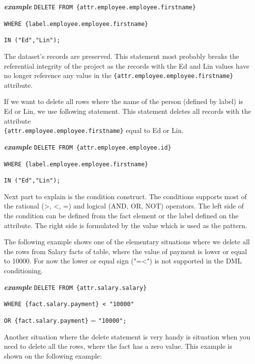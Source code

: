 \documentclass[a4paper, 12pt, titlepage, fleqn]{article}
\begin{document}
\textbf{\emph{example}}  \hspace{.9cm}\verb=DELETE FROM {attr.employee.employee.firstname}=

\hspace{2.5cm}\verb=WHERE {label.employee.employee.firstname}=

\hspace{2.5cm}\verb=IN ("Ed","Lin");=

The dataset’s records are preserved. This statement most probably breaks the referential integrity of the project as the records with the Ed and Lin values have no longer reference any value in the \verb={attr.employee.employee.firstname}= attribute.

If we want to delete all rows where the name of the person (defined by label) is Ed or Lin, we use following statement. This statement deletes all records with the attribute\\ \verb={attr.employee.employee.firstname}= equal to Ed or Lin.

\textbf{\emph{example}}  \hspace{.9cm}\verb=DELETE FROM {attr.employee.employee.id}=

\hspace{2.5cm}\verb=WHERE {label.employee.employee.firstname}=

\hspace{2.5cm}\verb=IN ("Ed","Lin");=

Next part to explain is the condition construct. The conditions supports most of the rational (>, <, =) and logical (AND, OR, NOT) operators. The left side of the condition can be defined from the fact element or the label defined on the attribute. The right side is formulated by the value which is used as the pattern.

The following example shows one of the elementary situations where we delete all the rows from Salary facts of table, where the value of payment is lower or equal to 10000. For now the lower or equal sign ("=<") is not supported in the DML conditioning.

\textbf{\emph{example}}  \hspace{.9cm}\verb=DELETE FROM {attr.salary.salary}=

\hspace{2.5cm}\verb=WHERE {fact.salary.payment} < "10000"=

\hspace{2.5cm}\verb=OR {fact.salary.payment}= = \verb="10000";=

\noindent Another situation where the delete statement is very handy is situation when you need to delete all the rows, where the fact has a zero value. This example is shown on the following example:
\end{document}
